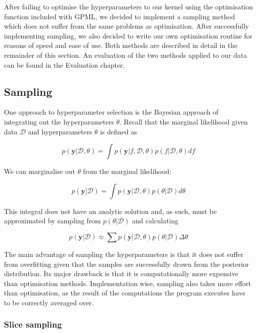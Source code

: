 \documentclass[a4paper,12pt,twoside,openright]{report}
\begin{document}
After failing to optimise the hyperparameters to our kernel using the optimisation function included with GPML, we decided to implement a sampling method which does not suffer from the same problems as optimisation. After successfully implementing sampling, we also decided to write our own optimisation routine for reasons of speed and ease of use. Both methods are described in detail in the remainder of this section. An evaluation of the two methods applied to our data can be found in the Evaluation chapter.

\subsection{Sampling}
One approach to hyperparameter selection is the Bayesian approach of integrating out the hyperparameters $\theta$. Recall that the marginal likelihood given data $\mathcal{D}$ and hyperparameters $\theta$ is defined as

\begin{equation}
p(\mathbf{y}|\mathcal{D}, \theta) = \int p(\mathbf{y}|f, \mathcal{D}, \theta)p(f|\mathcal{D}, \theta) df
\end{equation}

We can marginalise out $\theta$ from the marginal likelihood:

\begin{equation}
p(\mathbf{y}|\mathcal{D}) = \int p(\mathbf{y}|\mathcal{D}, \theta)p(\theta|\mathcal{D}) d\theta
\end{equation}

This integral does not have an analytic solution and, as such, must be approximated by sampling from $p(\theta|\mathcal{D})$ and calculating

\begin{equation}
p(\mathbf{y}|\mathcal{D}) \approx \sum p(\mathbf{y}|\mathcal{D}, \theta)p(\theta|\mathcal{D}) \Delta\theta
\end{equation}

The main advantage of sampling the hyperparameters is that it does not suffer from overfitting given that the samples are successfully drawn from the posterior distribution. Its major drawback is that it is computationally more expensive than optimisation methods. Implementation wise, sampling also takes more effort than optimisation, as the result of the computations the program executes have to be correctly averaged over.

\subsubsection{Slice sampling}
\end{document}
